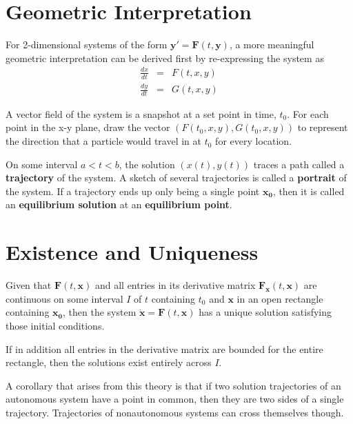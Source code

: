 \documentclass[11pt]{article}
\begin{document}
\section{Geometric Interpretation}
	For 2-dimensional systems of the form $\mathbf{y'} = \mathbf{F}(t, \mathbf{y})$, a more meaningful geometric interpretation can be derived first by re-expressing the system as
	\begin{eqnarray}
		\frac{dx}{dt} & = & F(t, x, y)\\
		\frac{dy}{dt} & = & G(t, x, y)
	\end{eqnarray}
	
	A vector field of the system is a snapshot at a set point in time, $t_0$. For each point in the x-y plane, draw the vector $(F(t_0, x, y), G(t_0, x, y))$ to represent the direction that a particle would travel in at $t_0$ for every location.
	
	On some interval $a < t < b$, the solution $(x(t), y(t))$ traces a path called a \textbf{trajectory} of the system. A sketch of several trajectories is called a \textbf{portrait} of the system. If a trajectory ends up only being a single point $\mathbf{x_0}$, then it is called an \textbf{equilibrium solution} at an \textbf{equilibrium point}.
	
\section{Existence and Uniqueness}
	Given that $\mathbf{F}(t, \mathbf{x})$ and all entries in its derivative matrix $\mathbf{F}_{\mathbf{x}}(t, \mathbf{x})$ are continuous on some interval $I$ of $t$ containing $t_0$ and $\mathbf{x}$ in an open rectangle containing $\mathbf{x_0}$, then the system $\dot{\mathbf{x}} = \mathbf{F}(t, \mathbf{x})$ has a unique solution satisfying those initial conditions.
	
	If in addition all entries in the derivative matrix are bounded for the entire rectangle, then the solutions exist entirely across $I$.
	
	A corollary that arises from this theory is that if two solution trajectories of an autonomous system have a point in common, then they are two sides of a single trajectory. Trajectories of nonautonomous systems can cross themselves though.
	
\end{document}
